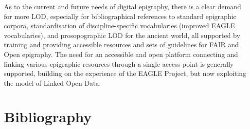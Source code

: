 \documentclass[
  12pt,
]{scrreprt}
\begin{document}
As to the current and future needs of digital epigraphy, there is a
clear demand for more LOD, especially for bibliographical references to
standard epigraphic corpora, standardisation of discipline-specific
vocabularies (improved EAGLE vocabularies), and prosopographic LOD for
the ancient world, all supported by training and providing accessible
resources and sets of guidelines for FAIR and Open epigraphy. The need
for an accessible and open platform connecting and linking various
epigraphic resources through a single access point is generally
supported, building on the experience of the EAGLE Project, but now
exploiting the model of Linked Open Data.

\hypertarget{bibliography}{%
\chapter{Bibliography}\label{bibliography}}
\end{document}
